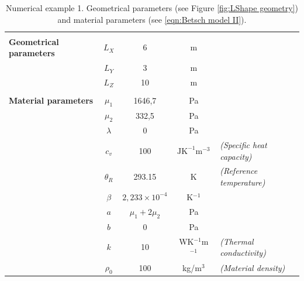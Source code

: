 \begin{table}[htbp]
	\centering
	\caption{Numerical example 1. Geometrical parameters (see Figure \ref{fig:LShape geometry}) and material parameters (see \eqref{eqn:Betsch model II}).}
	\label{table:LShape parameters}
	\vspace{2mm}
	\begin{tabular}{l | c c c l|}
		\cellcolor{gray!15}&&&&\\
		\cellcolor{gray!15}\textbf{Geometrical parameters}  &  $L_X$ &  6  &  m  &		\\
		\cellcolor{gray!15}  &  $L_Y$ & 3 & m &\\
		\cellcolor{gray!15}	&  $L_Z$ & 10 & m &\\
		\hline
		\cellcolor{gray!15}&&&\\
		\cellcolor{gray!15}\textbf{Material parameters}  &  $\mu_1$ &  1646,7  &  Pa &
		\\
		\cellcolor{gray!15}&  $\mu_2$ & 332,5 & Pa &\\ %
		\cellcolor{gray!15}&  $\lambda$ & 0 & Pa &\\
		\cellcolor{gray!15}&  $c_v$ & 100 & $\text{J}\text{K}^{-1}\text{m}^{-3}$& \textit{(Specific heat capacity)}\\
		\cellcolor{gray!15}&  $\theta_R$ & 293.15 & K& \textit{(Reference temperature)}\\
		\cellcolor{gray!15}&  $\beta$ & $2,233\times10^{-4}$ & K$^{-1}$&\\
		\cellcolor{gray!15}&  $a$ & $\mu_1+  2\mu_2$ & Pa&\\
		\cellcolor{gray!15}&  $b$ & 0 & Pa&\\
		\cellcolor{gray!15}&  $k$ & 10 & WK$^{-1}$m$^{-1}$& \textit{(Thermal conductivity)}\\	
		\cellcolor{gray!15}&  $\rho_0$ & 100 & kg/$\text{m}^3$& \textit{(Material density)}\\				
	\end{tabular}
\end{table}


